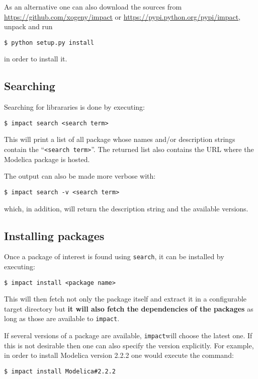 \documentclass[11pt,a4paper,twocolumn]{article}
\newcommand{\impact}{\texttt{impact}} %
\newcommand{\code}[1]{\texttt{#1}} %
\begin{document}
As an alternative one can also download the sources from
\url{https://github.com/xogeny/impact} or
\url{https://pypi.python.org/pypi/impact},
unpack and run
\begin{verbatim}
$ python setup.py install
\end{verbatim}

in order to install it.

\subsection{Searching} %
\label{cmd:search}

Searching for librararies is done by executing:

\begin{verbatim}
$ impact search <search term>
\end{verbatim}

This will print a list of all package whose names and/or description
strings contain the ``\code{<search term>}''. The returned list also
contains the URL where the Modelica package is hosted.

The output can also be made more verbose with:
\begin{verbatim}
$ impact search -v <search term>
\end{verbatim}
which, in addition, will return the description string and the
available versions.

\subsection{Installing packages} %
\label{cmd:install-pkg}
Once a package of interest is found using \code{search}, it can be
installed by executing:
\begin{verbatim}
$ impact install <package name>
\end{verbatim}
This will then fetch not only the package itself and extract it in a
configurable target directory but \textbf{it will also fetch the
  dependencies of the packages} as long as those are available to
\impact.

If several versions of a package are available, \impact will choose
the latest one. If this is not desirable then one can also specify the
version explicitly. For example, in order to install Modelica version
2.2.2 one would execute the command:
\begin{verbatim}
$ impact install Modelica#2.2.2
\end{verbatim}
\end{document}
